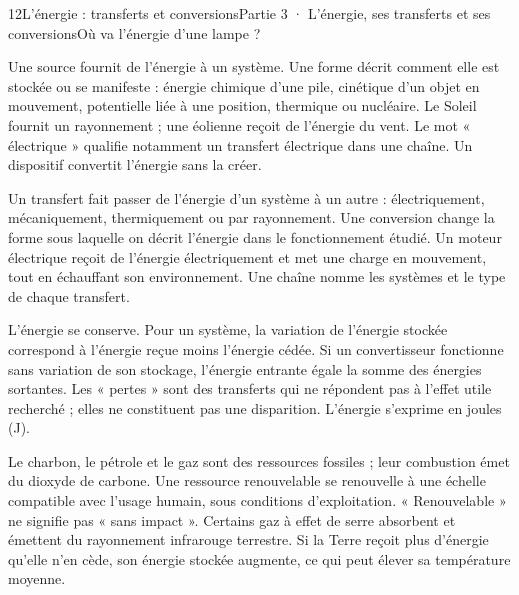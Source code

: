 \begin{ouverture}[college3]{12}{L’énergie : transferts et conversions}{Partie 3 · L’énergie, ses transferts et ses conversions}{Où va l’énergie d’une lampe ?}
\end{ouverture}
\label{ess-12}
Une source fournit de l’énergie à un système. Une forme décrit comment elle est stockée ou se manifeste : énergie chimique d’une pile, cinétique d’un objet en mouvement, potentielle liée à une position, thermique ou nucléaire. Le Soleil fournit un rayonnement ; une éolienne reçoit de l’énergie du vent. Le mot « électrique » qualifie notamment un transfert électrique dans une chaîne. Un dispositif convertit l’énergie sans la créer.\par
{}
Un transfert fait passer de l’énergie d’un système à un autre : électriquement, mécaniquement, thermiquement ou par rayonnement. Une conversion change la forme sous laquelle on décrit l’énergie dans le fonctionnement étudié. Un moteur électrique reçoit de l’énergie électriquement et met une charge en mouvement, tout en échauffant son environnement. Une chaîne nomme les systèmes et le type de chaque transfert.\par
\clearpage
{}
L’énergie se conserve. Pour un système, la variation de l’énergie stockée correspond à l’énergie reçue moins l’énergie cédée. Si un convertisseur fonctionne sans variation de son stockage, l’énergie entrante égale la somme des énergies sortantes. Les « pertes » sont des transferts qui ne répondent pas à l’effet utile recherché ; elles ne constituent pas une disparition. L’énergie s’exprime en joules (J).\par
{}
Le charbon, le pétrole et le gaz sont des ressources fossiles ; leur combustion émet du dioxyde de carbone. Une ressource renouvelable se renouvelle à une échelle compatible avec l’usage humain, sous conditions d’exploitation. « Renouvelable » ne signifie pas « sans impact ». Certains gaz à effet de serre absorbent et émettent du rayonnement infrarouge terrestre. Si la Terre reçoit plus d’énergie qu’elle n’en cède, son énergie stockée augmente, ce qui peut élever sa température moyenne.\par
